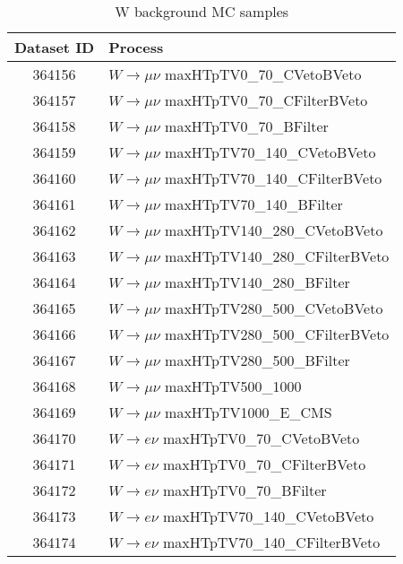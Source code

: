 \documentclass[12pt, a4paper]{book}
\begin{document}
\begin{table}[!h]
    \centering
    \caption{W background MC samples}
    \begin{tabular}{c|l}\midrule\midrule
        Dataset ID              & Process\\\midrule
        364156                  & $W\rightarrow \mu\nu$ maxHTpTV0\_70\_CVetoBVeto\\ 
        364157                  & $W\rightarrow \mu\nu$ maxHTpTV0\_70\_CFilterBVeto\\
        364158                  & $W\rightarrow \mu\nu$ maxHTpTV0\_70\_BFilter\\
        364159                  & $W\rightarrow \mu\nu$ maxHTpTV70\_140\_CVetoBVeto\\
        364160                  & $W\rightarrow \mu\nu$ maxHTpTV70\_140\_CFilterBVeto\\ 
        364161                  & $W\rightarrow \mu\nu$ maxHTpTV70\_140\_BFilter\\
        364162                  & $W\rightarrow \mu\nu$ maxHTpTV140\_280\_CVetoBVeto\\
        364163                  & $W\rightarrow \mu\nu$ maxHTpTV140\_280\_CFilterBVeto\\
        364164                  & $W\rightarrow \mu\nu$ maxHTpTV140\_280\_BFilter\\
        364165                  & $W\rightarrow \mu\nu$ maxHTpTV280\_500\_CVetoBVeto\\
        364166                  & $W\rightarrow \mu\nu$ maxHTpTV280\_500\_CFilterBVeto\\
        364167                  & $W\rightarrow \mu\nu$ maxHTpTV280\_500\_BFilter\\
        364168                  & $W\rightarrow \mu\nu$ maxHTpTV500\_1000\\
        364169                  & $W\rightarrow \mu\nu$ maxHTpTV1000\_E\_CMS\\
        364170                  & $W\rightarrow e\nu$ maxHTpTV0\_70\_CVetoBVeto\\
        364171                  & $W\rightarrow e\nu$ maxHTpTV0\_70\_CFilterBVeto\\
        364172                  & $W\rightarrow e\nu$ maxHTpTV0\_70\_BFilter\\
        364173                  & $W\rightarrow e\nu$ maxHTpTV70\_140\_CVetoBVeto\\
        364174                  & $W\rightarrow e\nu$ maxHTpTV70\_140\_CFilterBVeto\\

\end{tabular}
\end{table}
\end{document}

